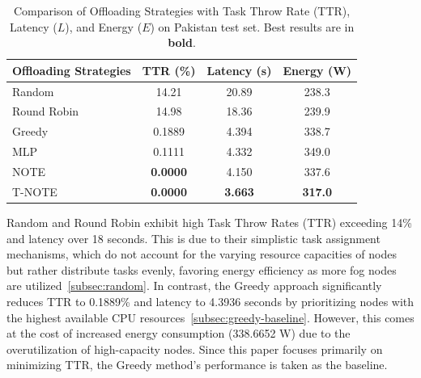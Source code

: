 \documentclass[preprint,3p,authoryear]{elsarticle}
\begin{document}
\begin{table}[htbp]
\centering

\begin{tabular}{lccc}
\textbf{Offloading Strategies} & \textbf{TTR (\%)} & \textbf{Latency (s)} & \textbf{Energy (W)} \\
\hline
Random 
 & 14.21
 & 20.89 
 & 238.3 \\
 
Round Robin 
 & 14.98
 & 18.36
 & 239.9 \\
\hline
\hline
 
Greedy 
 & 0.1889
 & 4.394
 & 338.7 \\

\hline
 
MLP 
 & 0.1111
 & 4.332
 & 349.0 \\
 
NOTE 
 & \textbf{0.0000} 
 & 4.150
 & 337.6 \\
 
T-NOTE 
 & \textbf{0.0000} 
 & \textbf{3.663} 
 & \textbf{317.0} \\

\end{tabular}

\caption{Comparison of Offloading Strategies with Task Throw Rate (TTR), Latency (\(L\)), and Energy (\(E\)) on Pakistan test set.
Best results are in \textbf{bold}.}
\label{tab:results_comparison}
\end{table}

Random and Round Robin exhibit high Task Throw Rates (TTR) exceeding 14\% and latency over 18 seconds. This is due to their simplistic task assignment mechanisms, which do not account for the varying resource capacities of nodes but rather distribute tasks evenly, favoring energy efficiency as more fog nodes are utilized~\ref{subsec:random}. In contrast, the Greedy approach significantly reduces TTR to 0.1889\% and latency to 4.3936 seconds by prioritizing nodes with the highest available CPU resources~\ref{subsec:greedy-baseline}. However, this comes at the cost of increased energy consumption (338.6652 W) due to the overutilization of high-capacity nodes. Since this paper focuses primarily on minimizing TTR, the Greedy method's performance is taken as the baseline.
\end{document}
